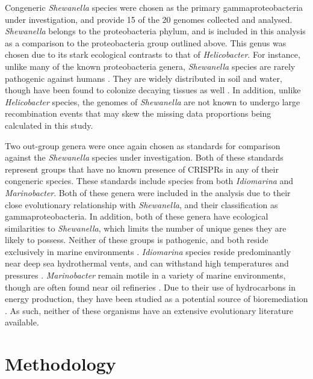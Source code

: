 \documentclass[english]{article}
\begin{document}
Congeneric \textit{Shewanella} species were chosen as the primary
gammaproteobacteria under investigation, and provide 15 of the 20
genomes collected and analysed. \textit{Shewanella} belongs to 
the 
proteobacteria phylum, and is included in this analysis as a comparison to
the proteobacteria group outlined above. This genus was chosen due to
its stark ecological contrasts to that of \textit{Helicobacter}. 
For instance,
unlike many of the known proteobacteria genera, \textit{Shewanella} 
species are
rarely pathogenic against humans \citep{Sharma10}. 
They are widely distributed in soil
and water, though have been found to colonize decaying tissues as well
\citep{Sharma10}. In
addition, unlike \textit{Helicobacter} species, the genomes of
\textit{Shewanella} are
not known to undergo large recombination  events that  may skew the
missing data  proportions  being calculated in this study. 

Two out-group genera were once again chosen as standards for
comparison against  the \textit{Shewanella} species under investigation.
Both of these standards represent groups that have no known presence
of CRISPRs  in any of their congeneric species. These standards
include species from both \textit{Idiomarina} and
\textit{Marinobacter}.
Both of these genera were included in the analysis due to their close
evolutionary relationship with \textit{Shewanella}, and their
classification as gammaproteobacteria. 
In addition, both of these genera have ecological
similarities to \textit{Shewanella}, which limits the number of 
unique genes 
they are likely to possess. 
Neither of these groups is
pathogenic, and both reside exclusively in marine environments
\citep{gauthier92} \citep{donachie03}.
\textit{Idiomarina} species reside predominantly 
near deep sea hydrothermal
vents, and can withstand high temperatures and 
pressures \citep{donachie03}.
\textit{Marinobacter} remain motile in a variety of 
marine environments, though are often
found near oil refineries \citep{gauthier92}. Due to their use of hydrocarbons in energy
production, they have been studied as a potential 
source of bioremediation \citep{gauthier92}. 
As such, neither of these organisms have an extensive evolutionary
literature available. 

\section{Methodology}
\thefontsize\large
\onehalfspacing
\end{document}
